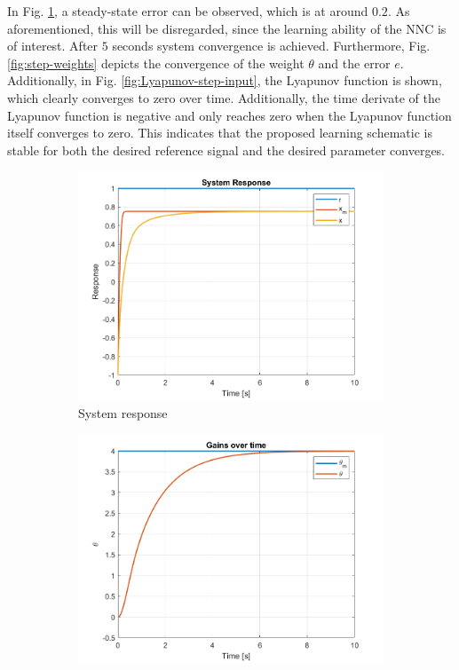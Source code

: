 In Fig. \ref{fig:step}, a steady-state error can be observed, which is at around $0.2$. As aforementioned, this will be disregarded, since the learning ability of the NNC is of interest. After $5$ seconds system convergence is achieved. Furthermore, Fig. \ref{fig:step-weights} depicts the convergence of the weight $\theta$ and the error $e$. Additionally, in Fig. \ref{fig:Lyapunov-step-input}, the Lyapunov function is shown, which clearly converges to zero over time. Additionally, the time derivate of the Lyapunov function is negative and only reaches zero when the Lyapunov function itself converges to zero. This indicates that the proposed learning schematic is stable for both the desired reference signal and the desired parameter converges.

\begin{figure}[!t]
 \centering
 \begin{subfigure}[b]{0.49\linewidth}
  \centering
  \includegraphics[width=\linewidth]{images/NL-MRAC-SIM/Step/v2/NMRAC_First-Order_Response.png}
  \caption{System response}
  \label{fig:step}
 \end{subfigure}
 \hfill
 \begin{subfigure}[b]{0.49\linewidth}
  \centering
  \includegraphics[width=\linewidth]{images/NL-MRAC-SIM/Step/v2/NMRAC_First-Order_Parameters.png}

\end{subfigure}
\end{figure}
